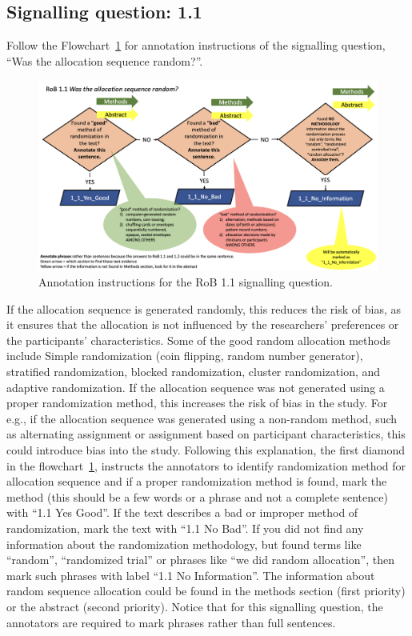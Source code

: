\documentclass[sn-mathphys,Numbered]{sn-jnl}%
\begin{document}
\subsection*{Signalling question: 1.1}
%
Follow the Flowchart~\ref{fig:1_1} for annotation instructions of the signalling question, ``Was the allocation sequence random?''.
%
\begin{figure}[hbt]
    \centering
    \includegraphics[width=\textwidth]{figures/1_1.png}
    \caption{Annotation instructions for the RoB 1.1 signalling question.}
    \label{fig:1_1}
\end{figure}

%
If the allocation sequence is generated randomly, this reduces the risk of bias, as it ensures that the allocation is not influenced by the researchers' preferences or the participants' characteristics.
Some of the good random allocation methods include Simple randomization (coin flipping, random number generator), stratified randomization, blocked randomization, cluster randomization, and adaptive randomization.
If the allocation sequence was not generated using a proper randomization method, this increases the risk of bias in the study.
For e.g., if the allocation sequence was generated using a non-random method, such as alternating assignment or assignment based on participant characteristics, this could introduce bias into the study.
Following this explanation, the first diamond in the flowchart~\ref{fig:1_1}, instructs the annotators to identify randomization method for allocation sequence and if a proper randomization method is found, mark the method (this should be a few words or a phrase and not a complete sentence) with ``1.1 Yes Good''.
If the text describes a bad or improper method of randomization, mark the text with ``1.1 No Bad''.
If you did not find any information about the randomization methodology, but found terms like ``random'', ``randomized trial'' or phrases like ``we did random allocation'', then mark such phrases with label ``1.1 No Information''.
The information about random sequence allocation could be found in the methods section (first priority) or the abstract (second priority).
Notice that for this signalling question, the annotators are required to mark phrases rather than full sentences.
%
%
%
\end{document}
